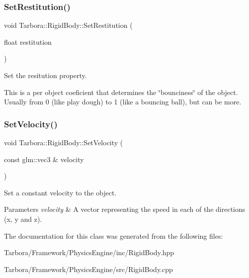 \subsubsection{\texorpdfstring{Set\+Restitution()}{SetRestitution()}}
{\footnotesize\ttfamily void Tarbora\+::\+Rigid\+Body\+::\+Set\+Restitution (\begin{DoxyParamCaption}\item[{float}]{restitution }\end{DoxyParamCaption})\hspace{0.3cm}{\ttfamily [inline]}}



Set the resitution property. 

This is a per object coeficient that determines the \char`\"{}bounciness\char`\"{} of the object. Usually from 0 (like play dough) to 1 (like a bouncing ball), but can be more. \mbox{\label{classTarbora_1_1RigidBody_adeeb63271e410f12a8ccc3b7d9cb95fb}} 
\subsubsection{\texorpdfstring{Set\+Velocity()}{SetVelocity()}}
{\footnotesize\ttfamily void Tarbora\+::\+Rigid\+Body\+::\+Set\+Velocity (\begin{DoxyParamCaption}\item[{const glm\+::vec3 \&}]{velocity }\end{DoxyParamCaption})}



Set a constant velocity to the object. 


\begin{DoxyParams}{Parameters}
{\em velocity} & A vector representing the speed in each of the directions (x, y and z). \\
\hline
\end{DoxyParams}


The documentation for this class was generated from the following files\+:\begin{DoxyCompactItemize}
\item 
Tarbora/\+Framework/\+Physics\+Engine/inc/Rigid\+Body.\+hpp\item 
Tarbora/\+Framework/\+Physics\+Engine/src/Rigid\+Body.\+cpp\end{DoxyCompactItemize}

